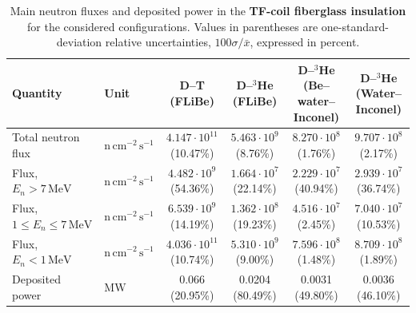 
\begin{table}[!h]
\centering
\caption{Main neutron fluxes and deposited power in the \textbf{TF-coil fiberglass insulation} for the considered configurations. Values in parentheses are one-standard-deviation relative uncertainties,
$100\sigma/\bar{x}$, expressed in percent.}
\label{tab:insulation}

\begin{tabular}{@{}llcccc@{}}
\toprule
Quantity
& Unit
& \makecell{D--T\\(FLiBe)}
& \makecell{D--$^3$He\\(FLiBe)}
& \makecell{D--$^3$He\\(Be--water--\\Inconel)}
& \makecell{D--$^3$He\\(Water--\\Inconel)}
\\
\midrule

Total neutron flux
& $\mathrm{n\,cm^{-2}\,s^{-1}}$
& $4.147\cdot 10^{11}$ (10.47\%)
& $5.463\cdot 10^{9}$ (8.76\%)
& $8.270\cdot 10^{8}$ (1.76\%)
& $9.707\cdot 10^{8}$ (2.17\%)
\\

Flux, $E_n>7\,\mathrm{MeV}$
& $\mathrm{n\,cm^{-2}\,s^{-1}}$
& $4.482\cdot 10^{9}$ (54.36\%)
& $1.664\cdot 10^{7}$ (22.14\%)
& $2.229\cdot 10^{7}$ (40.94\%)
& $2.939\cdot 10^{7}$ (36.74\%)
\\

Flux, $1\leq E_n\leq7\,\mathrm{MeV}$
& $\mathrm{n\,cm^{-2}\,s^{-1}}$
& $6.539\cdot 10^{9}$ (14.19\%)
& $1.362\cdot 10^{8}$ (19.23\%)
& $4.516\cdot 10^{7}$ (2.45\%)
& $7.040\cdot 10^{7}$ (10.53\%)
\\

Flux, $E_n<1\,\mathrm{MeV}$
& $\mathrm{n\,cm^{-2}\,s^{-1}}$
& $4.036\cdot 10^{11}$ (10.74\%)
& $5.310\cdot 10^{9}$ (9.00\%)
& $7.596\cdot 10^{8}$ (1.48\%)
& $8.709\cdot 10^{8}$ (1.89\%)
\\

\midrule
Deposited power
& $\mathrm{MW}$
& 0.066 (20.95\%)
& 0.0204 (80.49\%)
& 0.0031 (49.80\%)
& 0.0036 (46.10\%)
\\

\bottomrule
\end{tabular}
\end{table}

